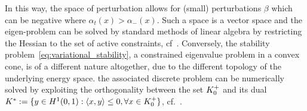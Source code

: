 In this way, the space of perturbation allows for (small) perturbations $\beta$ which can be negative where $\alpha_t(x)>\alpha_-(x)$. Such a space is a vector space and the eigen-problem can be solved by standard methods of linear algebra by restricting the Hessian to the set of active constraints, cf~\cite{Nocedal1999-zr}.
Conversely, the stability problem~\eqref{eq:variational_stability}, a constrained eigenvalue problem in a convex cone, is of a different nature altogether, due to the different topology of the underlying energy space. the associated discrete problem can be numerically solved by exploiting the orthogonality between the set $K^+_{0}$ and its dual $K^*:=\{y \in H^1(0,1): \langle x,y \rangle \leq 0, \forall x \in K^+_{0}\}$, cf.~\cite{moreau, pinto-da-costa}.





